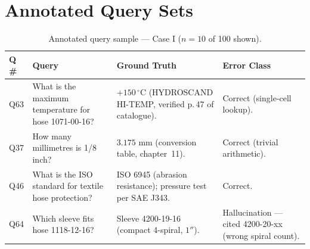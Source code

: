 
\section{Annotated Query Sets}
\label{app:annotated_query_sets}

\begin{table}[htbp]
    \captionsetup{skip=5pt}
    \caption{Annotated query sample — Case I ($n = 10$ of 100 shown).}
    \label{tab:qs_hydroscand}
    \centering
    \small
    \setlength{\tabcolsep}{4pt}
    \renewcommand{\arraystretch}{1}
    \begin{tabularx}{\textwidth}{p{} p{} p{} p{}}
        \toprule
        \textbf{Q\,\#} & \textbf{Query} & \textbf{Ground Truth} & \textbf{Error Class} \\
        \midrule
        Q63 &
        What is the maximum temperature for hose 1071-00-16? &
        $+150\,^{\circ}$C (HYDROSCAND HI-TEMP, verified p.\,47 of catalogue). &
        Correct (single-cell lookup). \\
        
        \addlinespace
        
        Q37 &
        How many millimetres is 1/8 inch? &
        $3.175$ mm (conversion table, chapter~11). &
        Correct (trivial arithmetic). \\
        
        \addlinespace
        
        Q46 &
        What is the ISO standard for textile hose protection? &
        ISO 6945 (abrasion resistance); pressure test per SAE J343. &
        Correct. \\
        
        \addlinespace
        
        Q64 &
        Which sleeve fits hose 1118-12-16? &
        Sleeve 4200-19-16 (compact 4-spiral, $1''$). &
        Hallucination — cited 4200-20-xx (wrong spiral count). \\
        

\end{tabularx}
\end{table}
